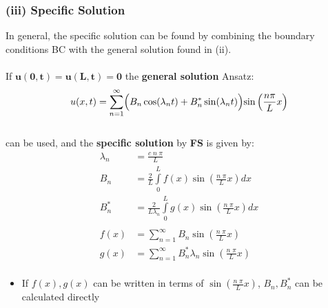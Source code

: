 \subsubsection{(iii) Specific Solution}
In general, the specific solution can be found by combining the boundary conditions BC 
with the general solution found in (ii).\\\hbox{}\\
If $\mathbf{u(0,t)=u(L,t)= 0}$ the \textbf{general solution} Ansatz:
\begin{equation*}
    u(x,t)=\sum\limits_{n=1}^{\infty}
    \Bigr( B_n \cos(\lambda _n t)+B_n^* \sin(\lambda_n t)\Bigl) \sin 
    \left(\frac{n \pi}{L}x \right)
\end{equation*}\\
can be used, and the \textbf{specific solution} by \textbf{FS} is given by:
\begin{align*}
    \lambda_n&=\frac{c\; n\; \pi}{L}\\
    B_n&=\frac{2}{L}\int\limits_0^L f(x)\sin(\frac{n\;\pi}{L}x)dx\\
    B_n^*&=\frac{2}{L\lambda_n} \int\limits_0^L g(x) \sin(\frac{n\;\pi}{L}x)dx\\\\
    f(x)&=\sum\limits_{n=1}^{\infty} B_n \sin(\frac{n\;\pi}{L}x)\\
    g(x)&=\sum\limits_{n=1}^{\infty} B_n^* \lambda_n \sin(\frac{n\;\pi}{L}x)\\
\end{align*}
\begin{itemize}
    \item If $f(x),g(x)$ can be written in terms of $\sin(\frac{n\;\pi}{L}x)$, $B_n, B_n^*$ 
    can be calculated directly
\end{itemize}
%
%

